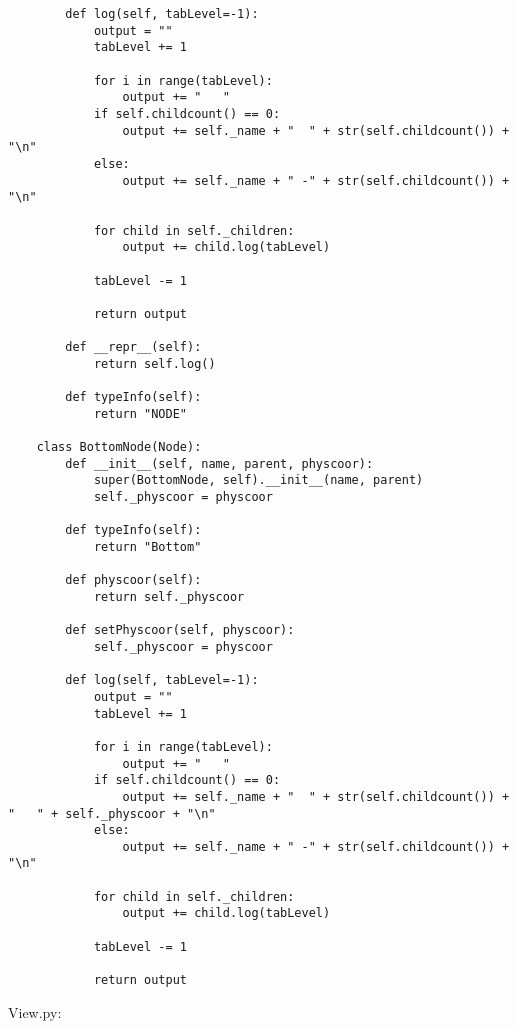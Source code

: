 \begin{verbatim}
        def log(self, tabLevel=-1):
            output = ""
            tabLevel += 1
    
            for i in range(tabLevel):
                output += "   "
            if self.childcount() == 0:
                output += self._name + "  " + str(self.childcount()) + "\n"
            else:
                output += self._name + " -" + str(self.childcount()) + "\n"
    
            for child in self._children:
                output += child.log(tabLevel)
    
            tabLevel -= 1
    
            return output
    
        def __repr__(self):
            return self.log()
    
        def typeInfo(self):
            return "NODE"
    
    class BottomNode(Node):
        def __init__(self, name, parent, physcoor):
            super(BottomNode, self).__init__(name, parent)
            self._physcoor = physcoor
    
        def typeInfo(self):
            return "Bottom"
    
        def physcoor(self):
            return self._physcoor
    
        def setPhyscoor(self, physcoor):
            self._physcoor = physcoor
    
        def log(self, tabLevel=-1):
            output = ""
            tabLevel += 1
    
            for i in range(tabLevel):
                output += "   "
            if self.childcount() == 0:
                output += self._name + "  " + str(self.childcount()) + "   " + self._physcoor + "\n"
            else:
                output += self._name + " -" + str(self.childcount()) + "\n"
    
            for child in self._children:
                output += child.log(tabLevel)
    
            tabLevel -= 1
    
            return output
\end{verbatim}

View.py:

